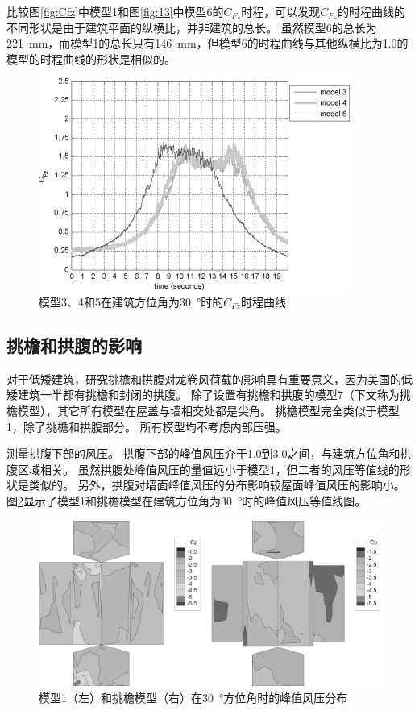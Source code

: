 \documentclass{ctexart}
\begin{document}
比较图\ref{fig:Cfz}中模型1和图\ref{fig:13}中模型6的$C_{Fz}$时程，可以发现$C_{Fz}$的时程曲线的不同形状是由于建筑平面的纵横比，并非建筑的总长。
虽然模型6的总长为\SI{221}{mm}，而模型1的总长只有\SI{146}{mm}，但模型6的时程曲线与其他纵横比为\num{1.0}的模型的时程曲线的形状是相似的。
\begin{figure}
\centering
\includegraphics[width=0.7\linewidth]{./fig/9.jpg}
\caption{模型3、4和5在建筑方位角为\SI{30}{\degree}时的$C_{Fz}$时程曲线}
\label{fig:9}
\end{figure}

\subsection{挑檐和拱腹的影响}
对于低矮建筑，研究挑檐和拱腹对龙卷风荷载的影响具有重要意义，因为美国的低矮建筑一半都有挑檐和封闭的拱腹。
除了设置有挑檐和拱腹的模型7（下文称为挑檐模型），其它所有模型在屋盖与墙相交处都是尖角。
挑檐模型完全类似于模型1，除了挑檐和拱腹部分。
所有模型均不考虑内部压强。

测量拱腹下部的风压。
拱腹下部的峰值风压介于\num{1.0}到\num{3.0}之间，与建筑方位角和拱腹区域相关。
虽然拱腹处峰值风压的量值远小于模型1，但二者的风压等值线的形状是类似的。
另外，拱腹对墙面峰值风压的分布影响较屋面峰值风压的影响小。
图\ref{fig:10}显示了模型1和挑檐模型在建筑方位角为\SI{30}{\degree}时的峰值风压等值线图。
\begin{figure}
\centering
\includegraphics[width=0.7\linewidth]{./fig/10.jpg}
\caption{模型1（左）和挑檐模型（右）在\SI{30}{\degree}方位角时的峰值风压分布}
\label{fig:10}
\end{figure}
\end{document}
